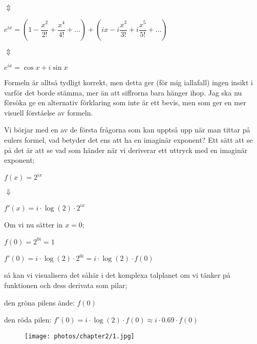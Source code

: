 \documentclass[10pt, a4paper]{amsart}
\begin{document}
\hspace{10ex}
$ \Updownarrow $
\bigskip

\hspace{5ex}
$ e^{ix} = \left(1 - \dfrac{x^2}{2!} + \dfrac{x^4}{4!} + \dotso\right) + \left(ix - i\dfrac{x^3}{3!} + i\dfrac{x^5}{5!} + \dotso\right) $
\bigskip

\hspace{10ex}
$ \Updownarrow $
\bigskip

\hspace{5ex}
$ e^{ix} = \cos x + i\sin x $
\bigskip
\bigskip

Formeln är alltså tydligt korrekt, men detta ger (för mig iallafall) ingen insikt i varför det borde stämma, mer än att siffrorna bara hänger ihop.
Jag ska nu försöka ge en alternativ förklaring som inte är ett bevis, men som ger en mer visuell förståelse av formeln.
\bigskip

Vi börjar med en av de första frågorna som kan upptså upp när man tittar på eulers formel, vad betyder det ens att ha en imaginär exponent?
Ett sätt att se på det är att se vad som händer när vi deriverar ett uttryck med en imaginär exponent;
\bigskip

\bigskip
\hspace{5ex}
$ f(x) = 2^{ix} $

\hspace{10ex}
$ \Downarrow $

\hspace{5ex}
$ f'(x) = i \cdot \log(2) \cdot 2^{ix} $
\bigskip
\bigskip

Om vi nu sätter in $ x = 0 $;
\bigskip

\bigskip
\hspace{5ex}
$ f(0) = 2^{0i} = 1 $

\hspace{5ex}
$ f'(0) = i \cdot \log(2) \cdot 2^{0i} = i \cdot \log(2) \cdot f(0) $
\bigskip
\bigskip

så kan vi visualisera det såhär i det komplexa talplanet om vi tänker på funktionen och dess derivata som pilar;
\bigskip

\bigskip
\hspace{5ex}
den gröna pilens ände: $ f(0) $

\hspace{5ex}
den röda pilen: $ f'(0) = i \cdot \log(2) \cdot f(0) \approx i \cdot 0.69 \cdot f(0) $

\bigskip
\begin{figure}[H]
    \texttt{[image: photos/chapter2/1.jpg]}
\end{figure}
\end{document}
